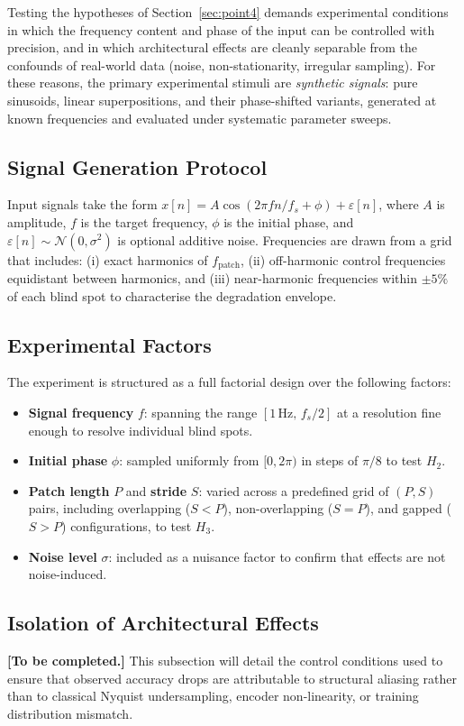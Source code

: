 Testing the hypotheses of Section~\ref{sec:point4} demands experimental conditions in which the frequency content and phase of the input can be controlled with precision, and in which architectural effects are cleanly separable from the confounds of real-world data (noise, non-stationarity, irregular sampling).
For these reasons, the primary experimental stimuli are \emph{synthetic signals}: pure sinusoids, linear superpositions, and their phase-shifted variants, generated at known frequencies and evaluated under systematic parameter sweeps.

\subsection{Signal Generation Protocol}

Input signals take the form $x[n] = A \cos(2\pi f n / f_s + \phi) + \varepsilon[n]$, where $A$ is amplitude, $f$ is the target frequency, $\phi$ is the initial phase, and $\varepsilon[n] \sim \mathcal{N}(0, \sigma^2)$ is optional additive noise.
Frequencies are drawn from a grid that includes: (i) exact harmonics of $f_{\mathrm{patch}}$, (ii) off-harmonic control frequencies equidistant between harmonics, and (iii) near-harmonic frequencies within $\pm 5\%$ of each blind spot to characterise the degradation envelope.

\subsection{Experimental Factors}

The experiment is structured as a full factorial design over the following factors:

\begin{itemize}
    \item \textbf{Signal frequency} $f$: spanning the range $[1\,\text{Hz},\, f_s/2]$ at a resolution fine enough to resolve individual blind spots.
    \item \textbf{Initial phase} $\phi$: sampled uniformly from $[0, 2\pi)$ in steps of $\pi/8$ to test $H_2$.
    \item \textbf{Patch length} $P$ and \textbf{stride} $S$: varied across a predefined grid of $(P, S)$ pairs, including overlapping ($S < P$), non-overlapping ($S = P$), and gapped ($S > P$) configurations, to test $H_3$.
    \item \textbf{Noise level} $\sigma$: included as a nuisance factor to confirm that effects are not noise-induced.
\end{itemize}

\subsection{Isolation of Architectural Effects}

\noindent\textbf{[To be completed.]}
This subsection will detail the control conditions used to ensure that observed accuracy drops are attributable to structural aliasing rather than to classical Nyquist undersampling, encoder non-linearity, or training distribution mismatch.
